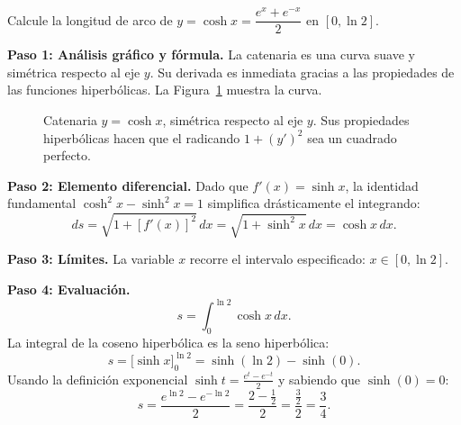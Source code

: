 \begin{example}
Calcule la longitud de arco de $y=\cosh x = \dfrac{e^x+e^{-x}}{2}$ en
$[0,\ln 2]$.

\begin{myproof}
\textbf{Paso 1: Análisis gráfico y fórmula.}
La catenaria es una curva suave y simétrica respecto al eje $y$. Su derivada es
inmediata gracias a las propiedades de las funciones hiperbólicas.
La Figura~\ref{fig:longitud_catenaria} muestra la curva.

\begin{figure}[H]
\centering
\caption{Catenaria $y=\cosh x$, simétrica respecto al eje $y$. Sus propiedades hiperbólicas hacen que el radicando $1+(y')^2$ sea un cuadrado perfecto.}
\label{fig:longitud_catenaria}
\end{figure}

\textbf{Paso 2: Elemento diferencial.}
Dado que $f'(x)=\sinh x$, la identidad fundamental $\cosh^2 x - \sinh^2 x = 1$
simplifica drásticamente el integrando:
\[ ds = \sqrt{1+[f'(x)]^2}\,dx = \sqrt{1+\sinh^2 x}\,dx = \cosh x\,dx. \]

\textbf{Paso 3: Límites.}
La variable $x$ recorre el intervalo especificado: $x\in[0,\ln 2]$.

\textbf{Paso 4: Evaluación.}
\[ s = \int_0^{\ln 2} \cosh x\,dx. \]
La integral de la coseno hiperbólica es la seno hiperbólica:
\[
  s = \bigl[\sinh x\bigr]_0^{\ln 2}
    = \sinh(\ln 2) - \sinh(0).
\]
Usando la definición exponencial $\sinh t = \frac{e^t-e^{-t}}{2}$ y sabiendo que $\sinh(0)=0$:
\[
  s = \frac{e^{\ln 2} - e^{-\ln 2}}{2}
    = \frac{2 - \frac{1}{2}}{2}
    = \frac{\frac{3}{2}}{2}
    = \boxed{\dfrac{3}{4}}.
\]
\end{myproof}
\end{example}

